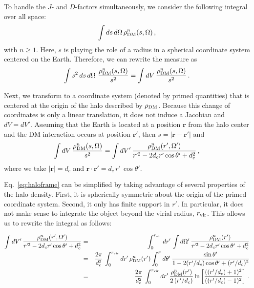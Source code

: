 To handle the $J$- and $D$-factors simultaneously, we consider the following integral over all space:
\begin{equation}
\int ds \, d\Omega \,\rho_{\rm DM}^n(s,\Omega)\,,
\end{equation}
with $n \geq 1$. Here, $s$ is playing the role of a radius in a spherical coordinate system centered on the Earth.  Therefore, we can rewrite the measure as
\begin{equation}
\int s^2\, ds \, d\Omega \,\, \frac{\rho_{\rm DM}^n(s,\Omega)}{s^2} = \int dV\, \frac{\rho_{\rm DM}^n(s,\Omega)}{s^2}\,.
\end{equation}

Next, we transform to a coordinate system (denoted by primed quantities) that is centered at the origin of the halo described by $\rho_{\rm DM}$.  Because this change of coordinates is only a linear translation, it does not induce a Jacobian and $dV = dV'$.  Assuming that the Earth is located at a position $\mathbf{r}$ from the halo center and the DM interaction occurs at position $\mathbf{r'}$, then $s = | \mathbf{r} - \mathbf{r}'| $ and
\begin{equation}
\int dV\, \frac{\rho_{\rm DM}^n(s,\Omega)}{s^2} = \int dV'\, \frac{\rho_{\rm DM}^n(r',\Omega')}{r^{\prime 2} - 2 d_c r' \cos \theta' + d_c^2}\,,
\label{eq:haloframe}
\end{equation}
where we take $|\mathbf{r}| = d_c$ and $\mathbf{r} \cdot \mathbf{r}' = d_c\, r' \, \cos\theta'$.

Eq.~\ref{eq:haloframe} can be simplified by taking advantage of several properties of the halo density.  First, it is spherically symmetric about the origin of the primed coordinate system.  Second, it only has finite support in $r'$.  In particular, it does not make sense to integrate the object beyond the virial radius, $r_{\rm vir}$. This allows us to rewrite the integral as follows:
\vspace{0.1in}

\begin{eqnarray}
\label{eq:multiline}
\int dV'\, \frac{\rho_{\rm DM}^n(r',\Omega')}{r^{\prime 2} - 2 d_c r' \cos \theta' + d_c^2}
&=& \int_0^{r_{\rm vir}} dr'\, \int d\Omega'\, \frac{\rho_{\rm DM}^n(r')}{r^{\prime 2} - 2 d_c r' \cos \theta' + d_c^2} \\
&=& \frac{2 \pi}{d_c^2} \, \int_0^{r_{\rm vir}} dr'\, \rho_{\rm DM}^n(r')  \int_0^{\pi} d\theta'\, \frac{\sin \theta'}{1 - 2 (r'/d_c) \cos \theta' + (r'/d_c)^2} \notag \\
&=& \frac{2\pi}{d_c^2} \, \int_0^{r_{\rm vir}} dr'\, \frac{ \rho_{\rm DM}^n(r')}{2\,(r'/d_c)} \ln \left[ \frac{((r'/d_c)+1)^2}{((r'/d_c)-1)^2} \right]\,. \notag
\end{eqnarray}

